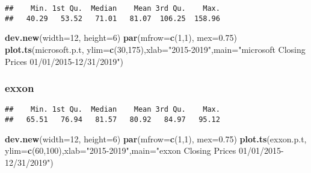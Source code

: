 \documentclass[]{article}
\newenvironment{Shaded}{\begin{snugshade}}{\end{snugshade}}
\newcommand{\KeywordTok}[1]{\textcolor[rgb]{0.13,0.29,0.53}{\textbf{#1}}}
\newcommand{\DataTypeTok}[1]{\textcolor[rgb]{0.13,0.29,0.53}{#1}}
\newcommand{\DecValTok}[1]{\textcolor[rgb]{0.00,0.00,0.81}{#1}}
\newcommand{\FloatTok}[1]{\textcolor[rgb]{0.00,0.00,0.81}{#1}}
\newcommand{\StringTok}[1]{\textcolor[rgb]{0.31,0.60,0.02}{#1}}
\newcommand{\OperatorTok}[1]{\textcolor[rgb]{0.81,0.36,0.00}{\textbf{#1}}}
\newcommand{\NormalTok}[1]{#1}
\begin{document}
\begin{verbatim}
##    Min. 1st Qu.  Median    Mean 3rd Qu.    Max. 
##   40.29   53.52   71.01   81.07  106.25  158.96
\end{verbatim}

\begin{Shaded}
\begin{Highlighting}[]
\KeywordTok{dev.new}\NormalTok{(}\DataTypeTok{width=}\DecValTok{12}\NormalTok{, }\DataTypeTok{height=}\DecValTok{6}\NormalTok{)}
\KeywordTok{par}\NormalTok{(}\DataTypeTok{mfrow=}\KeywordTok{c}\NormalTok{(}\DecValTok{1}\NormalTok{,}\DecValTok{1}\NormalTok{), }\DataTypeTok{mex=}\FloatTok{0.75}\NormalTok{)}
\KeywordTok{plot.ts}\NormalTok{(microsoft.p.t, }\DataTypeTok{ylim=}\KeywordTok{c}\NormalTok{(}\DecValTok{30}\NormalTok{,}\DecValTok{175}\NormalTok{),}\DataTypeTok{xlab=}\StringTok{"2015-2019"}\NormalTok{,}\DataTypeTok{main=}\StringTok{"microsoft Closing Prices 01/01/2015-12/31/2019"}\NormalTok{)}
\end{Highlighting}
\end{Shaded}

\subsubsection{exxon}\label{exxon}

\begin{Shaded}
\end{Shaded}

\begin{verbatim}
##    Min. 1st Qu.  Median    Mean 3rd Qu.    Max. 
##   65.51   76.94   81.57   80.92   84.97   95.12
\end{verbatim}

\begin{Shaded}
\begin{Highlighting}[]
\KeywordTok{dev.new}\NormalTok{(}\DataTypeTok{width=}\DecValTok{12}\NormalTok{, }\DataTypeTok{height=}\DecValTok{6}\NormalTok{)}
\KeywordTok{par}\NormalTok{(}\DataTypeTok{mfrow=}\KeywordTok{c}\NormalTok{(}\DecValTok{1}\NormalTok{,}\DecValTok{1}\NormalTok{), }\DataTypeTok{mex=}\FloatTok{0.75}\NormalTok{)}
\KeywordTok{plot.ts}\NormalTok{(exxon.p.t, }\DataTypeTok{ylim=}\KeywordTok{c}\NormalTok{(}\DecValTok{60}\NormalTok{,}\DecValTok{100}\NormalTok{),}\DataTypeTok{xlab=}\StringTok{"2015-2019"}\NormalTok{,}\DataTypeTok{main=}\StringTok{"exxon Closing Prices 01/01/2015-12/31/2019"}\NormalTok{)}
\end{Highlighting}
\end{Shaded}
\end{document}
